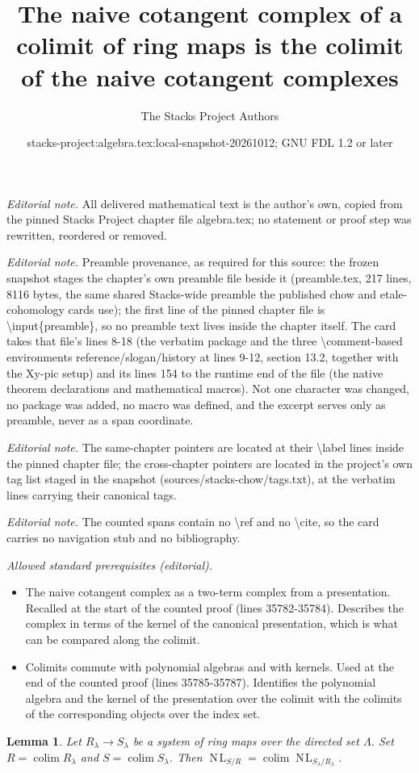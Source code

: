 \documentclass[10pt,a4paper]{amsart}
\title{The naive cotangent complex of a colimit of ring maps is the colimit of the naive cotangent complexes}
\author{The Stacks Project Authors}
\date{stacks-project:algebra.tex:local-snapshot-20261012; GNU FDL 1.2 or later}
\theoremstyle{plain}
\newtheorem{lemma}[subsection]{Lemma}
\theoremstyle{definition}
\theoremstyle{remark}
\numberwithin{equation}{subsection}
\def\colim{\mathop{\mathrm{colim}}\nolimits}
\def\NL{\mathop{N\!L}\nolimits}
\begin{document}
\maketitle
\noindent\textit{Editorial note.} All delivered mathematical text is the author's own, copied from the pinned Stacks Project chapter file algebra.tex; no statement or proof step was rewritten, reordered or removed.\par\medskip
\noindent\textit{Editorial note.} Preamble provenance, as required for this source: the frozen snapshot stages the chapter's own preamble file beside it (preamble.tex, 217 lines, 8116 bytes, the same shared Stacks-wide preamble the published chow and etale-cohomology cards use); the first line of the pinned chapter file is \textbackslash{}input\{preamble\}, so no preamble text lives inside the chapter itself. The card takes that file's lines 8-18 (the verbatim package and the three \textbackslash{}comment-based environments reference/slogan/history at lines 9-12, section 13.2, together with the Xy-pic setup) and its lines 154 to the runtime end of the file (the native theorem declarations and mathematical macros). Not one character was changed, no package was added, no macro was defined, and the excerpt serves only as preamble, never as a span coordinate.\par\medskip
\noindent\textit{Editorial note.} The same-chapter pointers are located at their \textbackslash{}label lines inside the pinned chapter file; the cross-chapter pointers are located in the project's own tag list staged in the snapshot (sources/stacks-chow/tags.txt), at the verbatim lines carrying their canonical tags.\par\medskip
\noindent\textit{Editorial note.} The counted spans contain no \textbackslash{}ref and no \textbackslash{}cite, so the card carries no navigation stub and no bibliography.\par\medskip
\noindent\textit{Allowed standard prerequisites (editorial).}\begin{itemize}
\item The naive cotangent complex as a two-term complex from a presentation. Recalled at the start of the counted proof (lines 35782-35784). Describes the complex in terms of the kernel of the canonical presentation, which is what can be compared along the colimit.
\item Colimits commute with polynomial algebras and with kernels. Used at the end of the counted proof (lines 35785-35787). Identifies the polynomial algebra and the kernel of the presentation over the colimit with the colimits of the corresponding objects over the index set.
\end{itemize}\medskip
\begin{lemma}
\label{lemma-colimits-NL}
Let $R_\lambda \to S_\lambda$ be a system of ring maps over
the directed set $\Lambda$.
Set $R = \colim R_\lambda$ and $S = \colim S_\lambda$.
Then $\NL_{S/R} = \colim \NL_{S_\lambda/R_\lambda}$.
\end{lemma}
\end{document}
